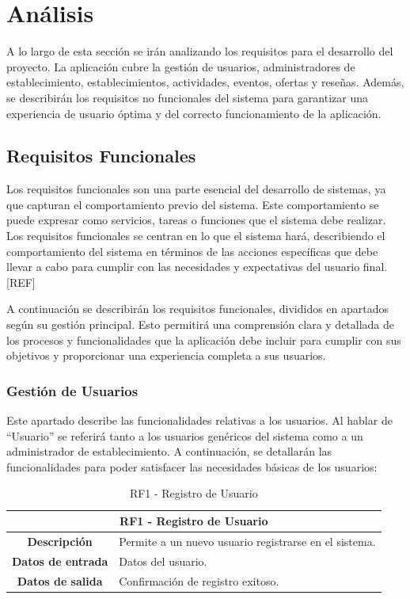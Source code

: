 \chapter{Análisis}

A lo largo de esta sección se irán analizando los requisitos para el desarrollo del proyecto. La aplicación cubre la gestión de usuarios, administradores de establecimiento, establecimientos, actividades, eventos, ofertas y reseñas. Además, se describirán los requisitos no funcionales del sistema para garantizar una experiencia de usuario óptima y del correcto funcionamiento de la aplicación.

\section{Requisitos Funcionales}

Los requisitos funcionales son una parte esencial del desarrollo de sistemas, ya que capturan el comportamiento previo del sistema. Este comportamiento se puede expresar como servicios, tareas o funciones que el sistema debe realizar. Los requisitos funcionales se centran en lo que el sistema hará, describiendo el comportamiento del sistema en
términos de las acciones específicas que debe llevar a  cabo para cumplir con las necesidades y expectativas del usuario final. [REF]

A continuación se describirán los requisitos funcionales, divididos en apartados según su gestión principal. Esto permitirá una comprensión clara y detallada de los procesos y funcionalidades que la aplicación debe incluir para cumplir con sus objetivos y proporcionar una experiencia completa a sus usuarios.


\subsection{Gestión de Usuarios}

Este apartado describe las funcionalidades relativas a los usuarios. Al hablar de “Usuario” se referirá tanto a los usuarios genéricos del sistema como a un administrador de establecimiento. A continuación, se detallarán las funcionalidades para poder satisfacer las necesidades básicas de los usuarios:

\begin{table}[H]
    \centering
    \begin{tabular}{|c|p{10cm}|}
        \hline
        \multicolumn{2}{|c|}{\textbf{RF1 - Registro de Usuario}}                          \\
        \hline
        \textbf{Descripción}      & Permite a un nuevo usuario registrarse en el sistema. \\
        \hline
        \textbf{Datos de entrada} & Datos del usuario.                                    \\
        \hline
        \textbf{Datos de salida}  & Confirmación de registro exitoso.                     \\
        \hline
    \end{tabular}
    \caption{RF1 - Registro de Usuario}
\end{table}

